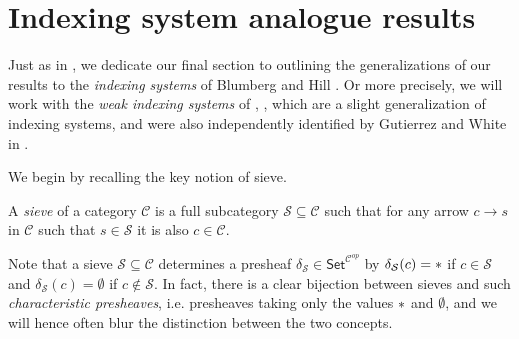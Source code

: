 \documentclass[a4paper,10pt
,draft
]{article}%
\begin{document}





\section{Indexing system analogue results}\label{INDEX SEC}

Just as in \cite[\S 9]{Per17}, we dedicate our final section
to outlining the generalizations of our results to the 
\textit{indexing systems} of Blumberg and Hill \cite{BH15}.
Or more precisely, we will work with the \textit{weak indexing systems}
of \cite[\S 9]{Per17}, \cite[\S 4.4]{BP17},
which are a slight generalization of indexing systems, 
and were also independently identified by Gutierrez and White in \cite{GW17}.


We begin by recalling the key notion of sieve.

\begin{definition}
A \textit{sieve} of a category $\mathcal{C}$
is a full subcategory $\mathcal{S} \subseteq \mathcal{C}$ such that for any arrow $c \to s$ in $\mathcal{C}$ such that $s \in \mathcal{S}$ it is also $c \in \mathcal{C}$.
\end{definition}

Note that a sieve $\mathcal{S} \subseteq \mathcal{C}$
determines a presheaf 
$\delta_{\mathcal{S}} \in \mathsf{Set}^{\mathcal{C}^{op}}$ by 
$\delta_{\mathcal{S}}(c) = \**$ if $c \in \mathcal{S}$ and
$\delta_{\mathcal{S}}(c) = \emptyset$ if $c \not \in \mathcal{S}$.
In fact, there is a clear bijection between sieves and such 
\textit{characteristic presheaves}, i.e. presheaves taking only the values $\**$ and $\emptyset$, 
and we will hence often blur the distinction between the two concepts.
\end{document}
